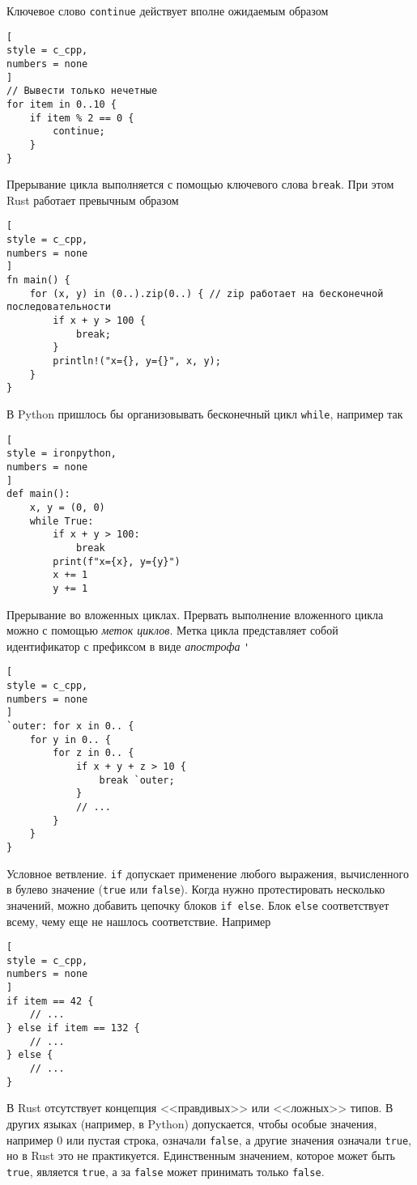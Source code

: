 \documentclass[%
	11pt,
	a4paper,
	utf8,
		]{article}
\begin{document}
Ключевое слово \texttt{continue} действует вполне ожидаемым образом
\begin{lstlisting}[
style = c_cpp,
numbers = none
]
// Вывести только нечетные 
for item in 0..10 {
    if item % 2 == 0 {
        continue;
    }
}
\end{lstlisting}

Прерывание цикла выполняется с помощью ключевого слова \texttt{break}. При этом Rust работает превычным образом
\begin{lstlisting}[
style = c_cpp,
numbers = none
]
fn main() {
    for (x, y) in (0..).zip(0..) { // zip работает на бесконечной последовательности
        if x + y > 100 {
            break;
        }
        println!("x={}, y={}", x, y);
    }
}
\end{lstlisting}

В Python пришлось бы организовывать бесконечный цикл \texttt{while}, например так
\begin{lstlisting}[
style = ironpython,
numbers = none
]
def main():
    x, y = (0, 0)
    while True:
        if x + y > 100:
            break
        print(f"x={x}, y={y}")
        x += 1
        y += 1
\end{lstlisting}

Прерывание во вложенных циклах. Прервать выполнение вложенного цикла можно с помощью \emph{меток циклов}. Метка цикла представляет собой идентификатор с префиксом в виде \emph{апострофа} \verb|'|
\begin{lstlisting}[
style = c_cpp,
numbers = none	
]
`outer: for x in 0.. {
    for y in 0.. {
        for z in 0.. {
            if x + y + z > 10 {
                break `outer;
            }
            // ...
        }
    }
}
\end{lstlisting}

Условное ветвление. \texttt{if} допускает применение любого выражения, вычисленного в булево значение (\texttt{true} или \texttt{false}). Когда нужно протестировать несколько значений, можно добавить цепочку блоков \texttt{if else}. Блок \texttt{else} соответствует всему, чему еще не нашлось соответствие. Например
\begin{lstlisting}[
style = c_cpp,
numbers = none
]
if item == 42 {
    // ...
} else if item == 132 {
    // ...
} else {
    // ...
}
\end{lstlisting}

В Rust отсутствует концепция <<правдивых>> или <<ложных>> типов. В других языках (например, в Python) допускается, чтобы особые значения, например 0 или пустая строка, означали \texttt{false}, а другие значения означали \texttt{true}, но в Rust это не практикуется. Единственным значением, которое может быть \texttt{true}, является \texttt{true}, а за \texttt{false} может принимать только \texttt{false}.
\end{document}
